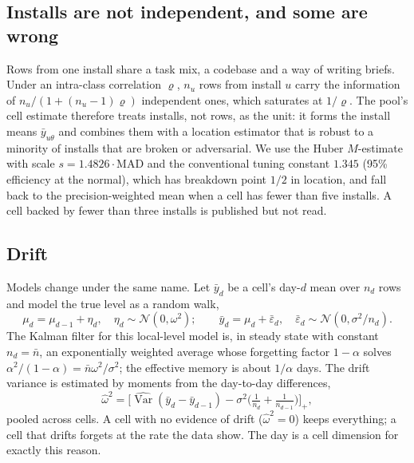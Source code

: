 \documentclass[10pt,a4paper]{article}
\theoremstyle{definition}
\theoremstyle{remark}
\begin{document}
\subsection{Installs are not independent, and some are wrong}

Rows from one install share a task mix, a codebase and a way of writing briefs. Under an intra-class correlation $\varrho$, $n_u$ rows from install $u$ carry the information of $n_u/(1+(n_u-1)\varrho)$ independent ones, which saturates at $1/\varrho$. The pool's cell estimate therefore treats installs, not rows, as the unit: it forms the install means $\bar y_{u\theta}$ and combines them with a location estimator that is robust to a minority of installs that are broken or adversarial. We use the Huber $M$-estimate with scale $s=1.4826\cdot\mathrm{MAD}$ and the conventional tuning constant $1.345$ (95\% efficiency at the normal), which has breakdown point $1/2$ in location, and fall back to the precision-weighted mean when a cell has fewer than five installs. A cell backed by fewer than three installs is published but not read.

\subsection{Drift}

Models change under the same name. Let $\bar y_d$ be a cell's day-$d$ mean over $n_d$ rows and model the true level as a random walk,
\begin{equation}
\mu_d=\mu_{d-1}+\eta_d,\quad \eta_d\sim\mathcal N(0,\omega^2);\qquad \bar y_d=\mu_d+\bar\varepsilon_d,\quad \bar\varepsilon_d\sim\mathcal N(0,\sigma^2/n_d).
\label{eq:localevel}
\end{equation}
The Kalman filter for this local-level model is, in steady state with constant $n_d=\bar n$, an exponentially weighted average whose forgetting factor $1-\alpha$ solves $\alpha^2/(1-\alpha)=\bar n\omega^2/\sigma^2$; the effective memory is about $1/\alpha$ days. The drift variance is estimated by moments from the day-to-day differences,
\begin{equation}
\hat\omega^2=\Big[\widehat{\operatorname{Var}}(\bar y_d-\bar y_{d-1})-\sigma^2\big(\tfrac1{n_d}+\tfrac1{n_{d-1}}\big)\Big]_+,
\label{eq:drift}
\end{equation}
pooled across cells. A cell with no evidence of drift ($\hat\omega^2=0$) keeps everything; a cell that drifts forgets at the rate the data show. The day is a cell dimension for exactly this reason.
\end{document}
